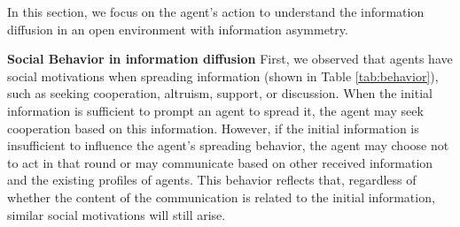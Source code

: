 In this section, we focus on the agent's action to understand the information diffusion in an open environment with information asymmetry.


\noindent \textbf{Social Behavior in information diffusion} \quad First, we observed that agents have social motivations when spreading information (shown in Table \ref{tab:behavior}), such as seeking cooperation, altruism, support, or discussion. When the initial information is sufficient to prompt an agent to spread it, the agent may seek cooperation based on this information. However, if the initial information is insufficient to influence the agent's spreading behavior, the agent may choose not to act in that round or may communicate based on other received information and the existing profiles of agents. This behavior reflects that, regardless of whether the content of the communication is related to the initial information, similar social motivations will still arise.



\begin{table}[ht]
    \centering
    
    \caption{The first four rows illustrate how different information asymmetry factors affect new agent diffusion. (a) and (b) represent the initial agent group settings, (c) and (d) show the external information asymmetry environment, and (e) is the proportion that new agents receive over 80\% similarity with the initial information.}
    \label{tab:newagent}
\end{table}



